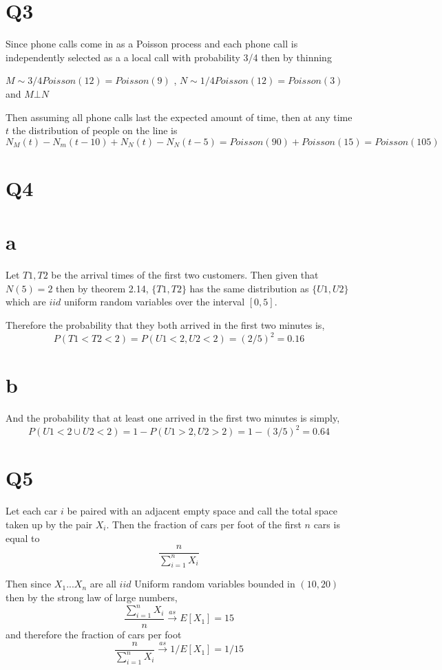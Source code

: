 \documentclass{article}
\begin{document}
\section*{Q3}

Since phone calls come in as a Poisson process and each phone call is independently selected as a 
a local call with probability 3/4 then by thinning

$M \sim 3/4 Poisson(12) = Poisson(9)$ , $N \sim 1/4 Poisson(12) = Poisson(3)$ and $M \bot N$

Then assuming all phone calls last the expected amount of time, then at any time $t$ the distribution of people on the line is 
$$
N_M(t) - N_m(t - 10) + N_N(t) - N_N(t-5) = Poisson(90) + Poisson(15) = Poisson(105)
$$



\section*{Q4}

\section*{a}
Let $T1, T2$ be the arrival times of the first two customers. Then given that $N(5) = 2$ then by theorem 2.14, $\{T1,T2\}$ has the same distribution as $\{U1, U2\}$ which are $iid$ uniform random variables over the interval $[0,5]$. 

Therefore the probability that they both arrived in the first two minutes is,
$$
P(T1 < T2 < 2) = P(U1 < 2, U2 < 2) = (2/5)^2 = 0.16
$$

\section*{b}

And the probability that at least one arrived in the first two minutes is simply,
$$
P(U1 < 2 \cup U2 < 2) = 1 - P(U1 > 2, U2 > 2) = 1 - (3/5)^2 =  0.64
$$

\section*{Q5}
Let each car $i$ be paired with an adjacent empty space and call the total space taken up by the pair $X_i$. Then the fraction of cars per foot of the first $n$ cars is equal to 
$$ \frac{n}{\sum_{i = 1} ^n X_i}
$$

Then since $X_1 ... X_n$ are all $iid$ Uniform random variables bounded in $(10, 20)$ then by the strong law of large numbers,
$$
\frac{\sum_{i = 1} ^{n} X_i}{ n} \overset{as}{\to} E[X_1] = 15
$$
and therefore the fraction of cars per foot
$$
\frac{n} {\sum_{i=1}^n X_i} \overset{as}{\to} 1 / E[X_1 ] = 1/15
$$
\end{document}
